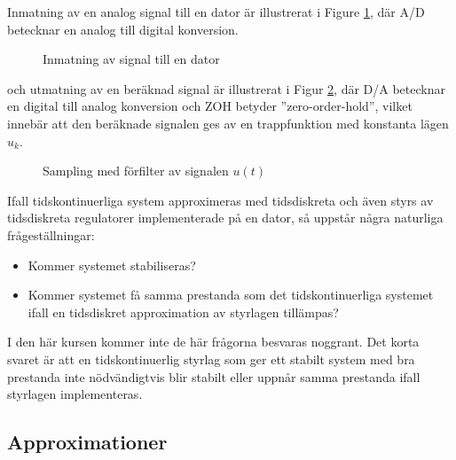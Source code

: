 \documentclass[12pt]{article}
\begin{document}
Inmatning av en analog signal till en dator är illustrerat i Figure \ref{fig:inmat}, där A/D betecknar en analog till digital konversion.
\begin{figure}[h!]
  \centering
  \caption{Inmatning av signal till en dator}
  \label{fig:inmat}
\end{figure}
\FloatBarrier
och utmatning av en beräknad signal är illustrerat i Figur \ref{fig:utmat}, där D/A betecknar en digital till analog konversion och ZOH betyder ''zero-order-hold'', vilket innebär att den beräknade signalen ges av en trappfunktion med konstanta lägen $u_k$.
\begin{figure}[h!]
  \centering
  \caption{Sampling med förfilter av signalen $u(t)$}
  \label{fig:utmat}
\end{figure}
\FloatBarrier
Ifall tidskontinuerliga system approximeras med tidsdiskreta och även styrs av tidsdiskreta regulatorer implementerade på en dator, så uppstår några naturliga frågeställningar:
\begin{itemize}
\item Kommer systemet stabiliseras?
\item Kommer systemet få samma prestanda som det tidskontinuerliga systemet ifall en tidsdiskret approximation av styrlagen tillämpas?
\end{itemize}
I den här kursen kommer inte de här frågorna besvaras noggrant. Det korta svaret är att en tidskontinuerlig styrlag som ger ett stabilt system med bra prestanda inte nödvändigtvis blir stabilt eller uppnår samma prestanda ifall styrlagen implementeras.

\subsection*{Approximationer}
\end{document}
